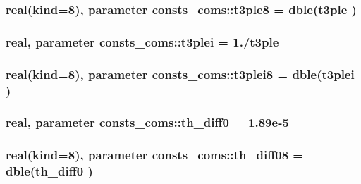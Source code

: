 \subsubsection[{\texorpdfstring{t3ple8}{t3ple8}}]{\setlength{\rightskip}{0pt plus 5cm}real(kind=8), parameter consts\+\_\+coms\+::t3ple8 = dble({\bf t3ple} )}\hypertarget{namespaceconsts__coms_a8b9e935024ff53349885cfe5e3259de3}{}\label{namespaceconsts__coms_a8b9e935024ff53349885cfe5e3259de3}
\subsubsection[{\texorpdfstring{t3plei}{t3plei}}]{\setlength{\rightskip}{0pt plus 5cm}real, parameter consts\+\_\+coms\+::t3plei = 1./{\bf t3ple}}\hypertarget{namespaceconsts__coms_a091ec81cfeedd9148a6f44471936ab4f}{}\label{namespaceconsts__coms_a091ec81cfeedd9148a6f44471936ab4f}
\subsubsection[{\texorpdfstring{t3plei8}{t3plei8}}]{\setlength{\rightskip}{0pt plus 5cm}real(kind=8), parameter consts\+\_\+coms\+::t3plei8 = dble({\bf t3plei} )}\hypertarget{namespaceconsts__coms_a9a4f83fc2d002ec3752516d7626b28c7}{}\label{namespaceconsts__coms_a9a4f83fc2d002ec3752516d7626b28c7}
\subsubsection[{\texorpdfstring{th\+\_\+diff0}{th_diff0}}]{\setlength{\rightskip}{0pt plus 5cm}real, parameter consts\+\_\+coms\+::th\+\_\+diff0 = 1.\+89e-\/5}\hypertarget{namespaceconsts__coms_a46eedb2769a2f899670b7245a8af4fa5}{}\label{namespaceconsts__coms_a46eedb2769a2f899670b7245a8af4fa5}
\subsubsection[{\texorpdfstring{th\+\_\+diff08}{th_diff08}}]{\setlength{\rightskip}{0pt plus 5cm}real(kind=8), parameter consts\+\_\+coms\+::th\+\_\+diff08 = dble({\bf th\+\_\+diff0} )}\hypertarget{namespaceconsts__coms_a26baa2bceffd0f1406090d5a3956fecb}{}\label{namespaceconsts__coms_a26baa2bceffd0f1406090d5a3956fecb}
